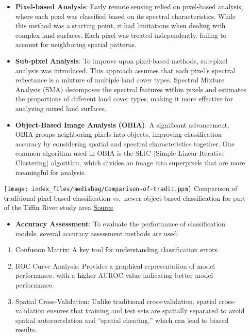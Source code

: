 \documentclass[
  letterpaper,
  DIV=11,
  numbers=noendperiod]{scrreprt}
\providecommand{\tightlist}{%
  \setlength{\itemsep}{0pt}\setlength{\parskip}{0pt}}\usepackage{longtable,booktabs,array}
\begin{document}
\begin{itemize}
\item
  \textbf{Pixel-based Analysis}: Early remote sensing relied on
  pixel-based analysis, where each pixel was classified based on its
  spectral characteristics. While this method was a starting point, it
  had limitations when dealing with complex land surfaces. Each pixel
  was treated independently, failing to account for neighboring spatial
  patterns.
\item
  \textbf{Sub-pixel Analysis}: To improve upon pixel-based methods,
  sub-pixel analysis was introduced. This approach assumes that each
  pixel's spectral reflectance is a mixture of multiple land cover
  types. Spectral Mixture Analysis (SMA) decomposes the spectral
  features within pixels and estimates the proportions of different land
  cover types, making it more effective for analyzing mixed land
  surfaces.
\item
  \textbf{Object-Based Image Analysis (OBIA)}: A significant
  advancement, OBIA groups neighboring pixels into objects, improving
  classification accuracy by considering spatial and spectral
  characteristics together. One common algorithm used in OBIA is the
  SLIC (Simple Linear Iterative Clustering) algorithm, which divides an
  image into superpixels that are more meaningful for analysis.
\end{itemize}

\texttt{[image: index\_files/mediabag/Comparison-of-tradit.ppm]}
Comparison of traditional pixel-based classification vs.~newer
object-based classification for part of the Tiffin River study area
\href{https://www.researchgate.net/figure/Comparison-of-traditional-pixel-based-classification-vs-newer-object-based_fig5_254599984}{Source}

\begin{itemize}
\tightlist
\item
  \textbf{Accuracy Assessment}: To evaluate the performance of
  classification models, several accuracy assessment methods are used:
\end{itemize}

\begin{enumerate}
\def\labelenumi{\arabic{enumi}.}
\item
  Confusion Matrix: A key tool for understanding classification errors.
\item
  ROC Curve Analysis: Provides a graphical representation of model
  performance, with a higher AUROC value indicating better model
  performance.
\item
  Spatial Cross-Validation: Unlike traditional cross-validation, spatial
  cross-validation ensures that training and test sets are spatially
  separated to avoid spatial autocorrelation and ``spatial cheating,''
  which can lead to biased results.
\end{enumerate}
\end{document}
